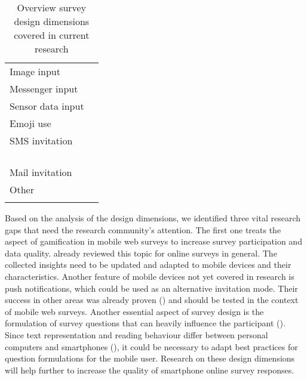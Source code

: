 \begin{table}
\begin{tabular}{ll}
    	Image input &\cite{bosch_answering_2019}\\
    	Messenger input & \cite{toepoel_probing_2021}\\
    	Sensor data input & \cite{hohne_motion_2020, hohne_surveymotion_2019}\\
    	Emoji  use & \cite{bacon_how_2017, bosch_using_2021}\\
    	SMS invitation & \cite{de_bruijne_comparing_2013, mavletova_data_2013}\\
    	& \cite{bucher_exploring_2021}\\
    	& \cite{de_bruijne_improving_2014}\\
    	& \cite{schlosser_mobile_2018}\\
    	& \cite{mavletova_mobile_2014}\\
    	Mail invitation & \cite{lugtig_recruiting_2019}\\
    	Other & \cite{wang_experimentation_2017, krebs_exploring_2021}\\
    	& \cite{mavletova_grouping_2016}\\
		\bottomrule 
	\end{tabular}
	\caption{Overview survey design dimensions covered in current research}
	\label{tab: design}
\end{table}

Based on the analysis of the design dimensions, we identified three vital research gaps that need the research community's attention. The first one treats the aspect of gamification in mobile web surveys to increase survey participation and data quality. \cite{keusch_review_2015} already reviewed this topic for online surveys in general. The collected insights need to be updated and adapted to mobile devices and their characteristics. Another feature of mobile devices not yet covered in research is push notifications, which could be used as an alternative invitation mode. Their success in other areas was already proven (\cite{stroud_effects_2019, pham_effects_2016}) and should be tested in the context of mobile web surveys. Another essential aspect of survey design is the formulation of survey questions that can heavily influence the participant (\cite{tourangeau_psychology_2000, groves_survey_2009}). Since text representation and reading behaviour differ between personal computers and smartphones (\cite{liu_reading_2016}), it could be necessary to adapt best practices for question formulations for the mobile user. Research on these design dimensions will help further to increase the quality of smartphone online survey responses.  